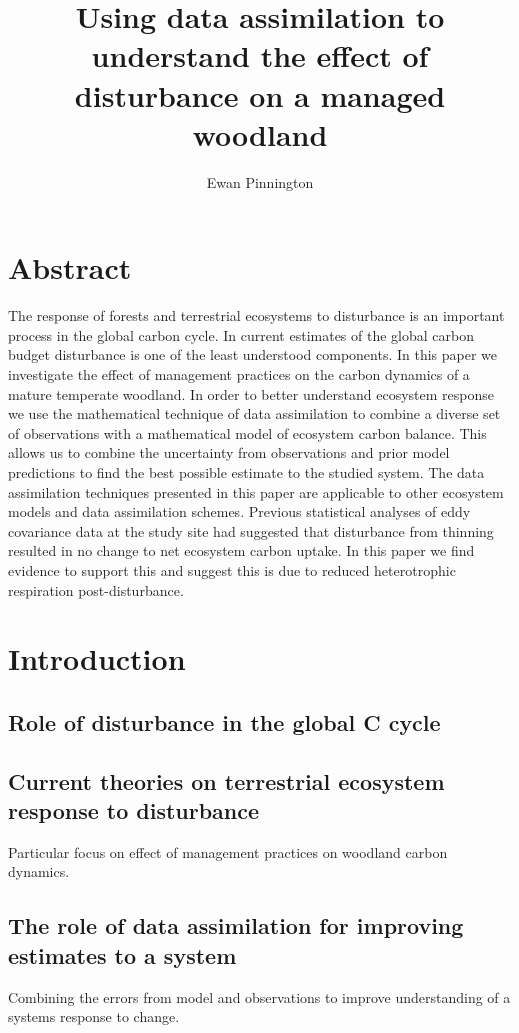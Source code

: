 \documentclass[11pt]{article}
\title{Using data assimilation to understand the effect of disturbance on a managed woodland}
\author{Ewan Pinnington}
\begin{document}
\maketitle


\section*{Abstract}
The response of forests and terrestrial ecosystems to disturbance is an important process in the global carbon cycle. In current estimates of the global carbon budget disturbance is one of the least understood components. In this paper we investigate the effect of management practices on the carbon dynamics of a mature temperate woodland. In order to better understand ecosystem response we use the mathematical technique of data assimilation to combine a diverse set of observations with a mathematical model of ecosystem carbon balance. This allows us to combine the uncertainty from observations and prior model predictions to find the best possible estimate to the studied system. The data assimilation techniques presented in this paper are applicable to other ecosystem models and data assimilation schemes. Previous statistical analyses of eddy covariance data at the study site had suggested that disturbance from thinning resulted in no change to net ecosystem carbon uptake. In this paper we find evidence to support this and suggest this is due to reduced heterotrophic respiration post-disturbance.  

\section{Introduction}
\subsection{Role of disturbance in the global C cycle}

\subsection{Current theories on terrestrial ecosystem response to disturbance}
Particular focus on effect of management practices on woodland carbon dynamics.

\subsection{The role of data assimilation for improving estimates to a system}
Combining the errors from model and observations to improve understanding of a systems response to change.
\end{document}
